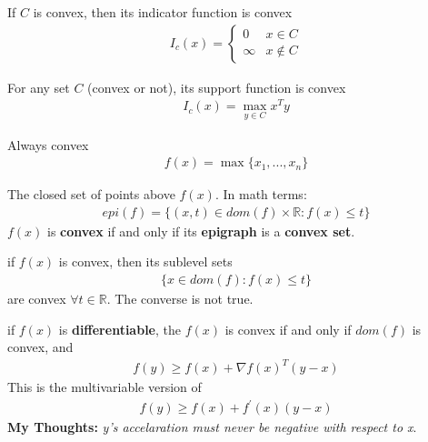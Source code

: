 \documentclass{article}
\begin{document}
\begin{headered_note}
  If $C$ is convex, then its indicator function is convex
  \begin{align}
    I_c(x)=\begin{cases}
      0      & x\in C    \\
      \infty & x\notin C
    \end{cases}
  \end{align}
\end{headered_note}
\begin{headered_note}
  For any set $C$ (convex or not), its support function is convex
  \begin{align}
    I_c(x)=\max_{y\in C}x^Ty
  \end{align}
\end{headered_note}
\begin{headered_note}
  Always convex
  \begin{align}
    f(x)=\max\{x_1,...,x_n\}
  \end{align}
\end{headered_note}
\begin{definition}
  The closed set of points above $f(x)$.  In math terms:
  \begin{align}
    epi(f)=\{(x,t)\in dom(f)\times \mathbb{R}:f(x)\leq t\}
  \end{align}
  $f(x)$ is \textbf{convex} if and only if its \textbf{epigraph} is a \textbf{convex set}.
\end{definition}
\begin{headered_note}
  if $f(x)$ is convex, then its sublevel sets
  \begin{align}
    \{x\in dom(f):f(x)\leq t\}
  \end{align}
  are convex $\forall t\in \mathbb{R}$.  The converse is not true.
\end{headered_note}
\begin{definition}
  if $f(x)$ is \textbf{differentiable}, the $f(x)$ is convex if and only if
  $dom(f)$ is convex, and
  \begin{align}
    f(y)\geq f(x)+\nabla f(x)^T(y-x)
  \end{align}
  This is the multivariable version of
  \begin{align}
    f(y)\geq f(x)+f^\prime(x)(y-x)
  \end{align}
  \textbf{My Thoughts:} \textit{y's accelaration must never be negative with respect to x}.
\end{definition}
\end{document}
